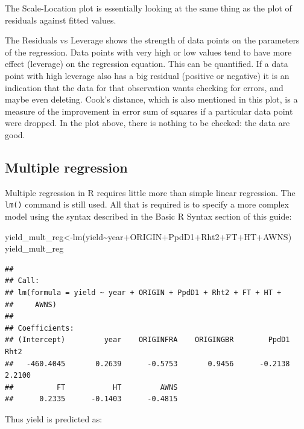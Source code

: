 \documentclass[
]{book}
\newenvironment{Shaded}{\begin{snugshade}}{\end{snugshade}}
\newcommand{\FunctionTok}[1]{\textcolor[rgb]{0.00,0.00,0.00}{#1}}
\newcommand{\NormalTok}[1]{#1}
\newcommand{\OtherTok}[1]{\textcolor[rgb]{0.56,0.35,0.01}{#1}}
\newcommand{\SpecialCharTok}[1]{\textcolor[rgb]{0.00,0.00,0.00}{#1}}
\begin{document}
The Scale-Location plot is essentially looking at the same thing as the plot of residuals against fitted values.

The Residuals vs Leverage shows the strength of data points on the parameters of the regression. Data points with very high or low values tend to have more effect (leverage) on the regression equation. This can be quantified. If a data point with high leverage also has a big residual (positive or negative) it is an indication that the data for that observation wants checking for errors, and maybe even deleting. Cook's distance, which is also mentioned in this plot, is a measure of the improvement in error sum of squares if a particular data point were dropped. In the plot above, there is nothing to be checked: the data are good.

\hypertarget{multiple-regression}{%
\subsection{Multiple regression}\label{multiple-regression}}

Multiple regression in R requires little more than simple linear regression. The \texttt{lm()} command is still used. All that is required is to specify a more complex model using the syntax described in the Basic R Syntax section of this guide:

\begin{Shaded}
\begin{Highlighting}[]
\NormalTok{yield\_mult\_reg}\OtherTok{\textless{}{-}}\FunctionTok{lm}\NormalTok{(yield}\SpecialCharTok{\textasciitilde{}}\NormalTok{year}\SpecialCharTok{+}\NormalTok{ORIGIN}\SpecialCharTok{+}\NormalTok{PpdD1}\SpecialCharTok{+}\NormalTok{Rht2}\SpecialCharTok{+}\NormalTok{FT}\SpecialCharTok{+}\NormalTok{HT}\SpecialCharTok{+}\NormalTok{AWNS)}
\NormalTok{yield\_mult\_reg}
\end{Highlighting}
\end{Shaded}

\begin{verbatim}
## 
## Call:
## lm(formula = yield ~ year + ORIGIN + PpdD1 + Rht2 + FT + HT + 
##     AWNS)
## 
## Coefficients:
## (Intercept)         year    ORIGINFRA    ORIGINGBR        PpdD1         Rht2  
##   -460.4045       0.2639      -0.5753       0.9456      -0.2138       2.2100  
##          FT           HT         AWNS  
##      0.2335      -0.1403      -0.4815
\end{verbatim}

Thus yield is predicted as:
\end{document}
